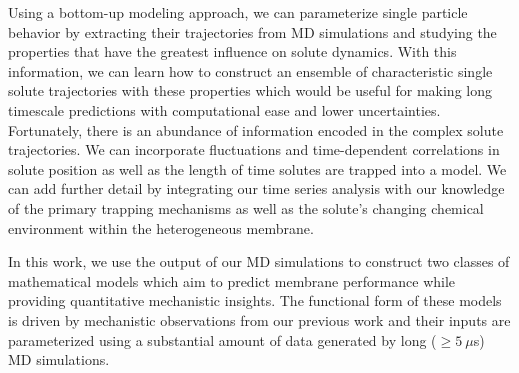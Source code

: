 \documentclass[aps,pre,preprint,groupedaddress]{revtex4-2}
\begin{document}
  Using a bottom-up modeling approach, we can parameterize single particle behavior
  by extracting their trajectories from MD simulations and studying the properties that
  have the greatest influence on solute dynamics. With this information, we can learn
  how to construct an ensemble of characteristic single solute trajectories with these
  properties which would be useful for making long timescale predictions with computational
  ease and lower uncertainties. Fortunately, there is an abundance of information encoded
  in the complex solute trajectories. We can incorporate fluctuations and time-dependent 
  correlations in solute position as well as the length of time solutes are trapped into a
  model. We can add further
  detail by integrating our time series analysis with our knowledge of the primary
  trapping mechanisms as well as the solute's changing chemical environment within
  the heterogeneous membrane. 

  
  In this work, we use the output of our MD simulations to construct two classes of 
  mathematical models which aim to predict membrane performance while providing quantitative 
  mechanistic insights. The functional form of these models is driven by mechanistic 
  observations from our previous work and their inputs are parameterized using a 
  substantial amount of data generated by long ($\geq 5~\mu$s) MD simulations. 
  
\end{document}
